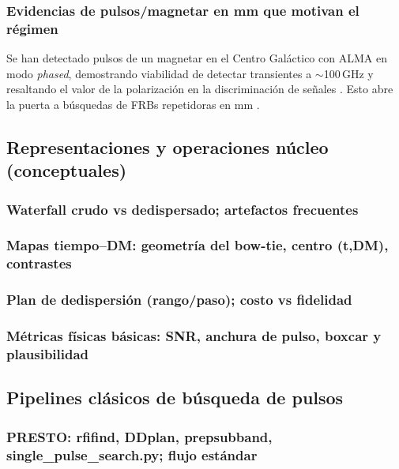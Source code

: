 \subsubsection{Evidencias de pulsos/magnetar en mm que motivan el régimen}

Se han detectado pulsos de un magnetar en el Centro Galáctico con ALMA en modo 
\textit{phased}, demostrando viabilidad de detectar transientes a $\sim$100\,GHz y 
resaltando el valor de la polarización en la discriminación de señales 
\citep{Matthews2018,veracasanova2025}. Esto abre la puerta a búsquedas de FRBs repetidoras en mm 
\citep{veracasanova2025}.


\subsection{Representaciones y operaciones núcleo (conceptuales)}

\subsubsection{Waterfall crudo vs dedispersado; artefactos frecuentes}

\subsubsection{Mapas tiempo--DM: geometría del bow-tie, centro (t,DM), contrastes}

\subsubsection{Plan de dedispersión (rango/paso); costo vs fidelidad}

\subsubsection{Métricas físicas básicas: SNR, anchura de pulso, boxcar y plausibilidad}


\subsection{Pipelines clásicos de búsqueda de pulsos}

\subsubsection{PRESTO: rfifind, DDplan, prepsubband, single\_pulse\_search.py; flujo estándar}

